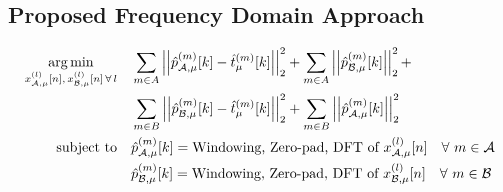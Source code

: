 \subsection{Proposed Frequency Domain Approach}
\begin{align}
    \argmin{x_{\za,\mu}^{(l)}[n],\,x_{\zb,\mu}^{(l)}[n]\,\forall\,l}{
       &\sum_{m\in A} \norm[2][2]{\hat{p}_{\za,\mu}^{(m)}[k] - \hat{t}_\mu^{(m)}[k]} +
        \sum_{m\in A} \norm[2][2]{\hat{p}_{\zb,\mu}^{(m)}[k]} + \\
       &\sum_{m\in B} \norm[2][2]{\hat{p}_{\zb,\mu}^{(m)}[k] - \hat{t}_\mu^{(m)}[k]} + 
        \sum_{m\in B} \norm[2][2]{\hat{p}_{\za,\mu}^{(m)}[k]}
    }\\
    \subjectto{
       &\hat{p}_{\za,\mu}^{(m)}[k] = \text{Windowing, Zero-pad, DFT of } x_{\za,\mu}^{(l)}[n]\quad\forall\ m\in\za \\
       &\hat{p}_{\zb,\mu}^{(m)}[k] = \text{Windowing, Zero-pad, DFT of } x_{\zb,\mu}^{(l)}[n]\quad\forall\ m\in\zb 
   }
\end{align}


